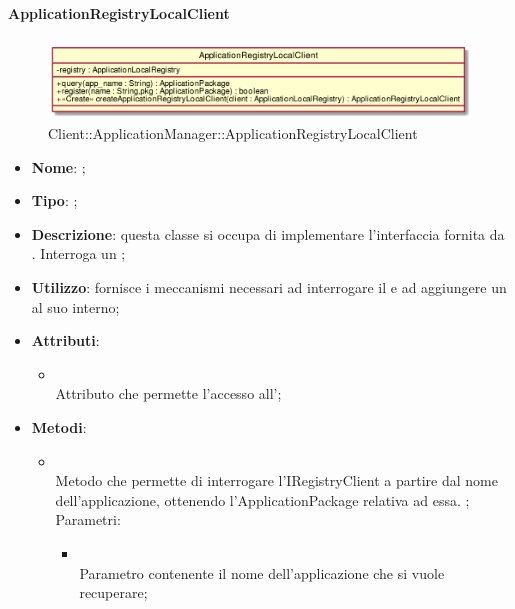 \hypertarget{ApplicationRegistryLocalClient_label}{\paragraph{ApplicationRegistryLocalClient}}
\begin{figure}[h]
	\centering
	\includegraphics[width=\textwidth,height=\textheight,keepaspectratio]{images/ClassApplicationRegistryLocalClient.png}
	\caption{Client::ApplicationManager::ApplicationRegistryLocalClient}
\end{figure}
\begin{itemize}
	\item \textbf{Nome}: ;
	\item \textbf{Tipo}: ;
	\item \textbf{Descrizione}: questa classe si occupa di implementare l'interfaccia fornita da . Interroga un ;
	\item \textbf{Utilizzo}: fornisce i meccanismi necessari ad interrogare il  e ad aggiungere un  al suo interno;
	\item \textbf{Attributi}:
	\begin{itemize}
		\item[]  \\
		Attributo che permette l'accesso all';
	\end{itemize}
	\item \textbf{Metodi}:
	\begin{itemize}
		\item[]  \\
		Metodo che permette di interrogare l'IRegistryClient a partire dal nome dell'applicazione, ottenendo l'ApplicationPackage relativa ad essa. ;\\
		Parametri:
		\begin{itemize}
			\item {} \\
			Parametro contenente il nome dell'applicazione che si vuole recuperare;
		\end{itemize}

\end{itemize}
\end{itemize}
